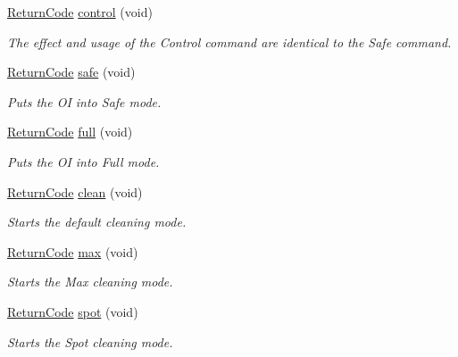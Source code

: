 \begin{DoxyCompactItemize}
\hyperlink{classroomba_1_1series500_1_1_open_interface_a43fc2ae1216e57cfb46901331b9ab4c7}{Return\+Code} \hyperlink{classroomba_1_1series500_1_1_open_interface_a5bfb6443b97a05df2577a04856b46d13}{control} (void)
\begin{DoxyCompactList}\small\item\em The effect and usage of the Control command are identical to the Safe command. \end{DoxyCompactList}\item 
\hyperlink{classroomba_1_1series500_1_1_open_interface_a43fc2ae1216e57cfb46901331b9ab4c7}{Return\+Code} \hyperlink{classroomba_1_1series500_1_1_open_interface_a899d23ab053c49ac6555c27f2474b5a0}{safe} (void)
\begin{DoxyCompactList}\small\item\em Puts the O\+I into Safe mode. \end{DoxyCompactList}\item 
\hyperlink{classroomba_1_1series500_1_1_open_interface_a43fc2ae1216e57cfb46901331b9ab4c7}{Return\+Code} \hyperlink{classroomba_1_1series500_1_1_open_interface_acddf44604466bed9ffd120dcf22e59e7}{full} (void)
\begin{DoxyCompactList}\small\item\em Puts the O\+I into Full mode. \end{DoxyCompactList}\item 
\hyperlink{classroomba_1_1series500_1_1_open_interface_a43fc2ae1216e57cfb46901331b9ab4c7}{Return\+Code} \hyperlink{classroomba_1_1series500_1_1_open_interface_ab194541a8bf4475315f2385e5b04a697}{clean} (void)
\begin{DoxyCompactList}\small\item\em Starts the default cleaning mode. \end{DoxyCompactList}\item 
\hyperlink{classroomba_1_1series500_1_1_open_interface_a43fc2ae1216e57cfb46901331b9ab4c7}{Return\+Code} \hyperlink{classroomba_1_1series500_1_1_open_interface_a82020e146db624bbeeb47e613544876f}{max} (void)
\begin{DoxyCompactList}\small\item\em Starts the Max cleaning mode. \end{DoxyCompactList}\item 
\hyperlink{classroomba_1_1series500_1_1_open_interface_a43fc2ae1216e57cfb46901331b9ab4c7}{Return\+Code} \hyperlink{classroomba_1_1series500_1_1_open_interface_a7126b2aa105dea4b043c7acb4650f7c0}{spot} (void)
\begin{DoxyCompactList}\small\item\em Starts the Spot cleaning mode. \end{DoxyCompactList}\item 

\end{DoxyCompactItemize}
